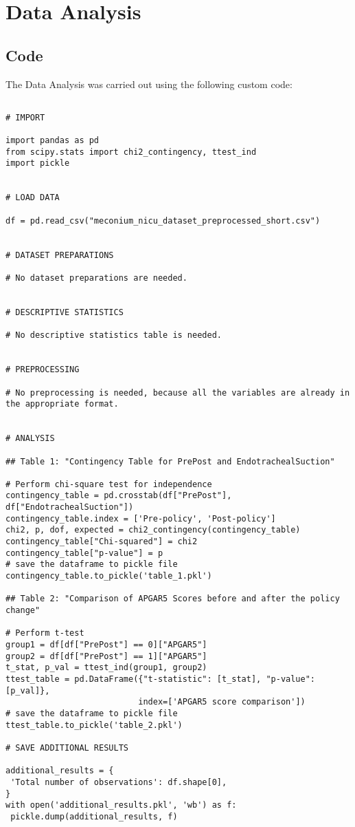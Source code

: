 \documentclass[11pt]{article}
\begin{document}
\section{Data Analysis} \subsection{Code}The Data Analysis was carried out using the following custom code:

\begin{verbatim}

# IMPORT

import pandas as pd
from scipy.stats import chi2_contingency, ttest_ind
import pickle


# LOAD DATA

df = pd.read_csv("meconium_nicu_dataset_preprocessed_short.csv")


# DATASET PREPARATIONS

# No dataset preparations are needed.


# DESCRIPTIVE STATISTICS

# No descriptive statistics table is needed.


# PREPROCESSING

# No preprocessing is needed, because all the variables are already in the appropriate format.


# ANALYSIS

## Table 1: "Contingency Table for PrePost and EndotrachealSuction"

# Perform chi-square test for independence
contingency_table = pd.crosstab(df["PrePost"], df["EndotrachealSuction"])
contingency_table.index = ['Pre-policy', 'Post-policy']
chi2, p, dof, expected = chi2_contingency(contingency_table)
contingency_table["Chi-squared"] = chi2
contingency_table["p-value"] = p
# save the dataframe to pickle file
contingency_table.to_pickle('table_1.pkl')

## Table 2: "Comparison of APGAR5 Scores before and after the policy change"

# Perform t-test
group1 = df[df["PrePost"] == 0]["APGAR5"]
group2 = df[df["PrePost"] == 1]["APGAR5"]
t_stat, p_val = ttest_ind(group1, group2)
ttest_table = pd.DataFrame({"t-statistic": [t_stat], "p-value": [p_val]},
                           index=['APGAR5 score comparison'])
# save the dataframe to pickle file
ttest_table.to_pickle('table_2.pkl')

# SAVE ADDITIONAL RESULTS

additional_results = {
 'Total number of observations': df.shape[0], 
}
with open('additional_results.pkl', 'wb') as f:
 pickle.dump(additional_results, f)

\end{verbatim}
\end{document}

